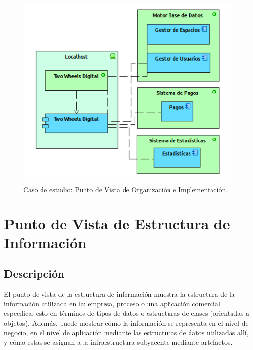 \begin{figure}[H]
	\centering
	\includegraphics[width=1.0\textwidth]{imagenes/Caso_Estudio/Tecnologia/organizacion_implementacion.PDF}
	\caption{Caso de estudio: Punto de Vista de Organización e Implementación.}
	\label{fig:gap_analysis}
\end{figure}


\section{Punto de Vista de Estructura de Información}
\subsection{Descripción}
El punto de vista de la estructura de información muestra la estructura de la información utilizada en la: empresa, proceso o una aplicación comercial específica; esto en términos de tipos de datos o estructuras de clases (orientadas a objetos). Además, puede mostrar cómo la información se representa en el nivel de negocio, en el nivel de aplicación mediante las estructuras de datos utilizadas allí, y cómo estas se asignan a la infraestructura subyacente mediante artefactos.


